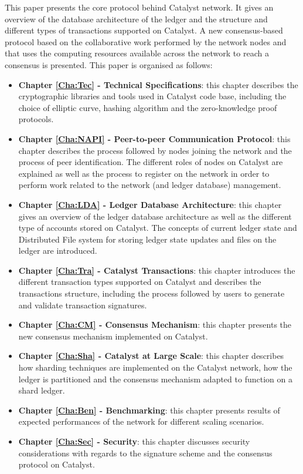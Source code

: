 This paper presents the core protocol behind Catalyst network. It gives an overview of the database architecture of the ledger and the structure and different types of transactions supported on Catalyst. A new consensus-based protocol based on the collaborative work performed by the network nodes and that uses the computing resources available across the network to reach a consensus is presented. This paper is organised as follows:

\begin{itemize}
\item \textbf{Chapter \ref{Cha:Tec} - Technical Specifications}: this chapter describes the cryptographic libraries and tools used in Catalyst code base, including the choice of elliptic curve, hashing algorithm and the zero-knowledge proof protocols. 

\item \textbf{Chapter \ref{Cha:NAPI} - Peer-to-peer Communication Protocol}: this chapter describes the process followed by nodes joining the network and the process of peer identification. The different roles of nodes on Catalyst are explained as well as the process to register on the network in order to perform work related to the network (and ledger database) management. 

\item \textbf{Chapter \ref{Cha:LDA} - Ledger Database Architecture}: this chapter gives an overview of the ledger database architecture as well as the different type of accounts stored on Catalyst. The concepts of current ledger state and Distributed File system for storing ledger state updates and files on the ledger are introduced. 

\item \textbf{Chapter \ref{Cha:Tra} - Catalyst Transactions}: this chapter introduces the different transaction types supported on Catalyst and describes the transactions structure, including the process followed by users to generate and validate transaction signatures. 

\item \textbf{Chapter \ref{Cha:CM} - Consensus Mechanism}: this chapter presents the new consensus mechanism implemented on Catalyst. 

\item \textbf{Chapter \ref{Cha:Sha} - Catalyst at Large Scale}: this chapter describes how sharding techniques are implemented on the Catalyst network, how the ledger is partitioned and the consensus mechanism adapted to function on a shard ledger. 

\item \textbf{Chapter \ref{Cha:Ben} - Benchmarking}: this chapter presents results of expected performances of the network for different scaling scenarios.

\item \textbf{Chapter \ref{Cha:Sec} - Security}: this chapter discusses security considerations with regards to the signature scheme and the consensus protocol on Catalyst. 

\end{itemize}